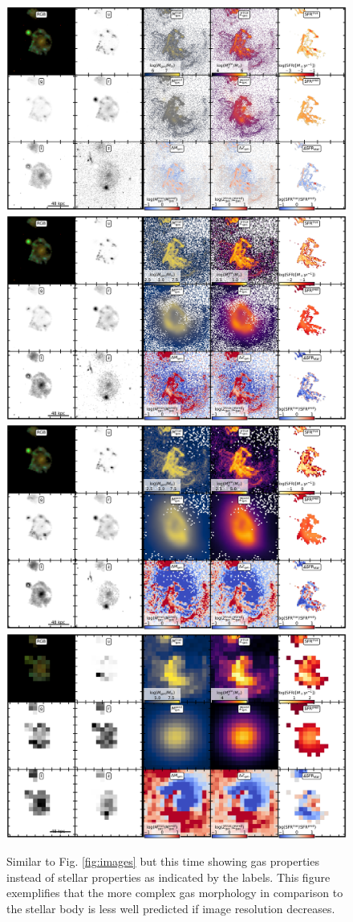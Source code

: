 \documentclass[useAMS,usenatbib]{mnras}
\begin{document}
\begin{figure}
\vspace{-.25cm}
\begin{center}
\includegraphics[width=.49\textwidth]{./plots/2096_masked_gas.pdf}
\includegraphics[width=.49\textwidth]{./plots/2096_masked_gas_2.pdf}
\includegraphics[width=.49\textwidth]{./plots/2096_masked_gas_4.pdf}
\includegraphics[width=.49\textwidth]{./plots/2096_masked_gas_16.pdf}
\end{center}
\vspace{-.35cm}
\caption{Similar to Fig. \ref{fig:images} but this time showing gas properties instead of stellar properties as indicated by the labels. This figure exemplifies that the more complex gas morphology in comparison to the stellar body is less well predicted if image resolution decreases.
}
\label{fig:app_res_comp_gas}
\end{figure}
\end{document}
